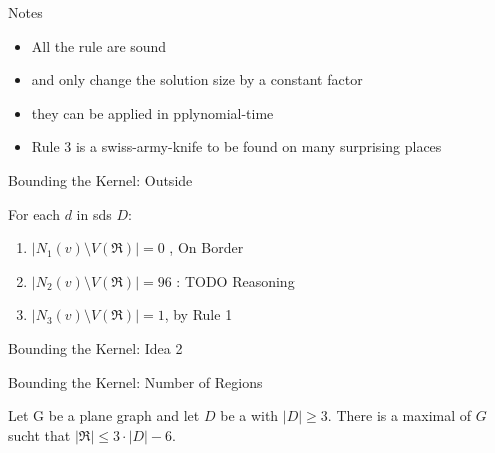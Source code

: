\begin{frame}[c]{Notes}
    \begin{itemize}
        \item All the rule are sound 
        \item and only change the solution size by a constant factor
        \item they can be applied in pplynomial-time
        \item Rule 3 is a swiss-army-knife to be found on many surprising places
    \end{itemize}
\end{frame}

\begin{frame}[c]{Bounding the Kernel: Outside}   
    \begin{figure}[!ht]
    \end{figure}

    \pause For each $d$ in sds $D$:
    \begin{enumerate}
           \pause \item $|N_1(v) \setminus V(\mathfrak{R})| = 0$ \cite{Alber2004}, On Border
           \pause \item $|N_2(v) \setminus V(\mathfrak{R})| = 96$ \cite{Alber2004}: TODO Reasoning  
           \pause \item $|N_3(v) \setminus V(\mathfrak{R})| = 1$, by Rule 1
        \end{enumerate}
\end{frame}
\begin{frame}[c]{Bounding the Kernel: Idea 2}

    \begin{figure}[!ht]
    \end{figure}
\end{frame}
\begin{frame}[c]{Bounding the Kernel: Number of Regions}

    \begin{figure}[!ht]

    \end{figure}
    \pause\begin{tcolorbox}[colback=TUMBlueLighter,title=Number of Regions \cite{Alber2004}]
        Let G be a plane graph and let $D$ be a \sds with $|D| \geq 3$. There is a maximal \dreg of $G$ sucht that $|\mathfrak{R}| \leq 3 \cdot |D|- 6$.
    \end{tcolorbox}

\end{frame}

